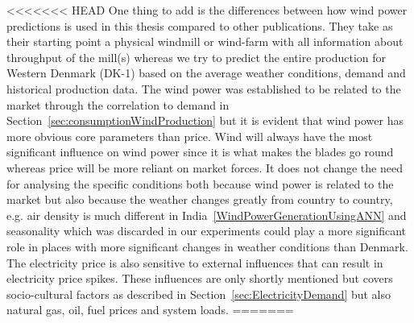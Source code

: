 <<<<<<< HEAD
One thing to add is the differences between how wind power predictions is used in this thesis compared to other publications. They take as their starting point a physical windmill or wind-farm with all information about throughput of the mill(s)\cite{windForecastPortugal,ShortTermWindPowerForecasting,dayAheadImpactOfWindPowerForecasts,WindPowerGenerationUsingANN} whereas we try to predict the entire production for Western Denmark (DK-1) based on the average weather conditions, demand and historical production data. The wind power was established to be related to the market through the correlation to demand in Section~\ref{sec:consumptionWindProduction} but it is evident that wind power has more obvious core parameters than price. Wind will always have the most significant influence on wind power since it is what makes the blades go round whereas price will be more reliant on market forces. It does not change the need for analysing the specific conditions both because wind power is related to the market but also because the weather changes greatly from country to country, e.g. air density is much different in India~\ref{WindPowerGenerationUsingANN} and seasonality which was discarded in our experiments could play a more significant role in places with more significant changes in weather conditions than Denmark. The electricity price is also sensitive to external influences that can result in electricity price spikes\cite{singhal2011electricity}. These influences are only shortly mentioned but covers socio-cultural factors as described in Section~\ref{sec:ElectricityDemand} but also natural gas, oil, fuel prices and system loads\cite{singhal2011electricity}.
=======
